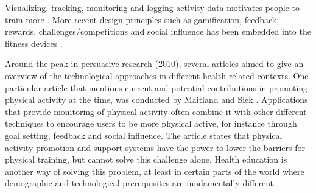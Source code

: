 Visualizing, tracking, monitoring and logging activity data motivates people to train more \cite{orji_persuasive_2018}. More recent design principles such as gamification, feedback, rewards, challenges/competitions and social influence has been embedded into the fitness devices
\cite{meske_potential_2019}.
 
Around the peak in persuasive research (2010), several articles aimed to give an overview of the technological approaches in different health related contexts. One particular article that mentions current and potential contributions in promoting physical activity at the time, was conducted by Maitland and Siek \cite{maitland_technological_2009}.
Applications that provide monitoring of physical activity often combine it with other different techniques to encourage users to be more physical active, for instance through goal setting, feedback and social influence. The article states that physical activity promotion and support systems have the power to lower the barriers for physical training, but cannot solve this challenge alone. Health education is another way of solving this problem, at least in certain parts of the world where demographic and technological prerequisites are fundamentally different.

